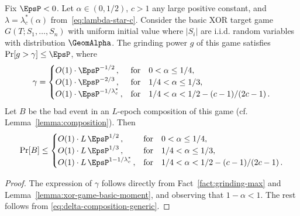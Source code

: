 \begin{theorem}\label{thm:basic-xor-game-geometric}
Fix $\EpsP < 0$.  
Let $\alpha \in (0, 1/2)$, $c > 1$ any large positive constant, 
and $\lambda = \lambda_c^*(\alpha)$ from~\eqref{eq:lambda-star-c}. 
Consider the basic XOR target game $G(T; S_1, \ldots, S_n)$ 
with uniform initial value where $|S_i|$ are i.i.d. random variables with distribution $\GeomAlpha$. 
The grinding power $g$ of this game satisfies $\Pr[g > \gamma] \leq \EpsP$, where
\[
\gamma = 
    \begin{cases}
        O(1)\cdot \EpsP^{-1/2}\, , 
            & \text{for}\quad 0 < \alpha \leq 1/4, \\
        O(1)\cdot \EpsP^{-2/3}\, , 
            & \text{for}\quad 1/4 < \alpha \leq 1/3, \\
        O(1)\cdot \EpsP^{ - 1/\lambda_c^*}\, ,
            &\text{for}\quad 1/4 < \alpha < 1/2 - (c-1)/(2c-1)\, .
    \end{cases}
\]
Let $B$ be the bad event in an $L$-epoch composition of this game (cf. Lemma~\ref{lemma:composition}). 
Then
\[
\Pr[B] \leq 
    \begin{cases}
        O(1)\cdot L\, \EpsP^{1/2}\, , 
            & \text{for}\quad 0 < \alpha \leq 1/4, \\
        O(1)\cdot L\, \EpsP^{1/3}\, , 
            & \text{for}\quad 1/4 < \alpha \leq 1/3, \\
        O(1)\cdot L\, \EpsP^{ 1 - 1/\lambda_c^* }\, ,
            &\text{for}\quad 1/4 < \alpha < 1/2 - (c-1)/(2c-1)\, . 
    \end{cases}
\]
\end{theorem}
\begin{proof}
The expression of $\gamma$ follows directly from Fact~\ref{fact:grinding-max} and Lemma~\ref{lemma:xor-game-basic-moment}, 
and observing that $1- \alpha < 1$.
The rest follows from \eqref{eq:delta-composition-generic}.
\end{proof}

